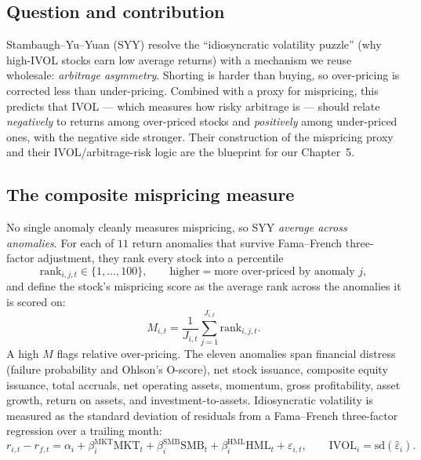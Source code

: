 \subsection*{Question and contribution}
Stambaugh--Yu--Yuan (SYY) resolve the ``idiosyncratic volatility puzzle'' (why high-IVOL stocks earn low average returns) with a mechanism we reuse wholesale: \emph{arbitrage asymmetry}. Shorting is harder than buying, so over-pricing is corrected less than under-pricing. Combined with a proxy for mispricing, this predicts that IVOL --- which measures how risky arbitrage is --- should relate \emph{negatively} to returns among over-priced stocks and \emph{positively} among under-priced ones, with the negative side stronger. Their construction of the mispricing proxy and their IVOL/arbitrage-risk logic are the blueprint for our Chapter~5.

\subsection*{The composite mispricing measure}
No single anomaly cleanly measures mispricing, so SYY \emph{average across anomalies}. For each of $11$ return anomalies that survive Fama--French three-factor adjustment, they rank every stock into a percentile
\begin{equation}
\mathrm{rank}_{i,j,t}\in\{1,\dots,100\}, \qquad \text{higher} = \text{more over-priced by anomaly } j,
\end{equation}
and define the stock's mispricing score as the average rank across the anomalies it is scored on:
\begin{equation}
M_{i,t} = \frac{1}{J_{i,t}}\sum_{j=1}^{J_{i,t}} \mathrm{rank}_{i,j,t}. \label{eq:syy-M}
\end{equation}
A high $M$ flags relative over-pricing. The eleven anomalies span financial distress (failure probability and Ohlson's O-score), net stock issuance, composite equity issuance, total accruals, net operating assets, momentum, gross profitability, asset growth, return on assets, and investment-to-assets. Idiosyncratic volatility is measured as the standard deviation of residuals from a Fama--French three-factor regression over a trailing month:
\begin{equation}
r_{i,t} - r_{f,t} = \alpha_i + \beta_i^{\text{MKT}}\mathrm{MKT}_t + \beta_i^{\text{SMB}}\mathrm{SMB}_t + \beta_i^{\text{HML}}\mathrm{HML}_t + \varepsilon_{i,t},\qquad \mathrm{IVOL}_{i}=\mathrm{sd}(\hat\varepsilon_i). \label{eq:ivol}
\end{equation}

